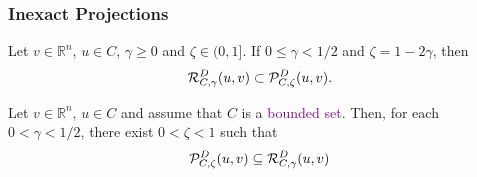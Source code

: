 


\begin{frame}[t]\frametitle{Inexact Projections}
  \begin{lemma}[2.14]
    Let $v \in {\mathbb R}^n$, $u \in C$, $\gamma \geq 0$  and $\zeta\in (0, 1]$.  If  $0 \leq \gamma <1/2$ and $\zeta=1-2\gamma$, then
    \[
      {\cal R}_{C,\gamma}^{D}(u, v) \subset {\cal P}_{C,\zeta}^{D}(u, v).
    \]
  \end{lemma}

  \bigskip
  \bigskip
  \bigskip

  \begin{proposition}[2.17]
    Let $v \in {\mathbb R}^n$, $u \in C$ and assume that $C$ is a \textcolor{purple}{bounded set}. Then, for each $0<\gamma < 1/2$,     there exist $0 < \zeta  <1$ such that
    \[
      {\cal P}_{C,\zeta}^{D}(u, v)  \subseteq    {\cal R}_{C,\gamma}^{D}(u, v)
    \]
  \end{proposition}
\end{frame}


